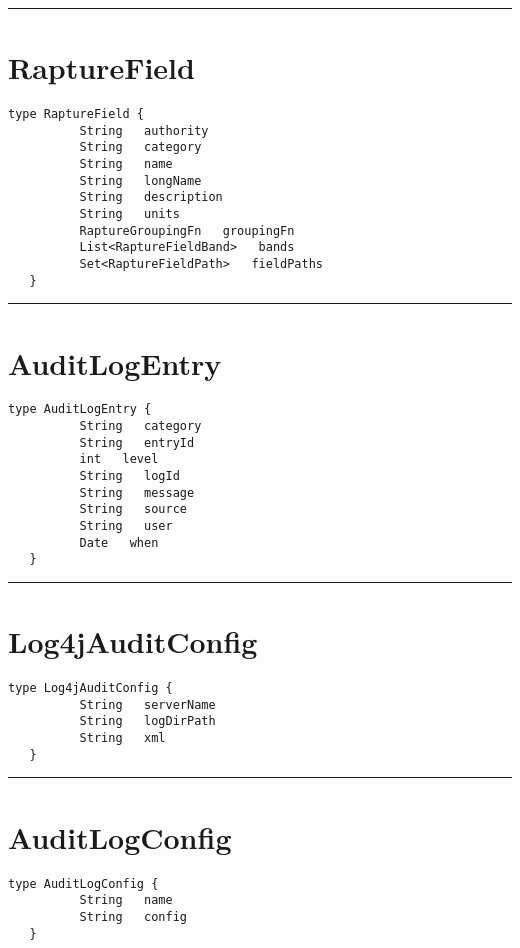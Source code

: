\rule{12cm}{2pt}
\section{RaptureField}
\label{type:RaptureField}

\begin{lstlisting}[style=nonumbers]
   type RaptureField {
          String   authority
          String   category
          String   name
          String   longName
          String   description
          String   units
          RaptureGroupingFn   groupingFn
          List<RaptureFieldBand>   bands
          Set<RaptureFieldPath>   fieldPaths
   }
\end{lstlisting}

\rule{12cm}{2pt}
\section{AuditLogEntry}
\label{type:AuditLogEntry}

\begin{lstlisting}[style=nonumbers]
   type AuditLogEntry {
          String   category
          String   entryId
          int   level
          String   logId
          String   message
          String   source
          String   user
          Date   when
   }
\end{lstlisting}

\rule{12cm}{2pt}
\section{Log4jAuditConfig}
\label{type:Log4jAuditConfig}

\begin{lstlisting}[style=nonumbers]
   type Log4jAuditConfig {
          String   serverName
          String   logDirPath
          String   xml
   }
\end{lstlisting}

\rule{12cm}{2pt}
\section{AuditLogConfig}
\label{type:AuditLogConfig}

\begin{lstlisting}[style=nonumbers]
   type AuditLogConfig {
          String   name
          String   config
   }
\end{lstlisting}

